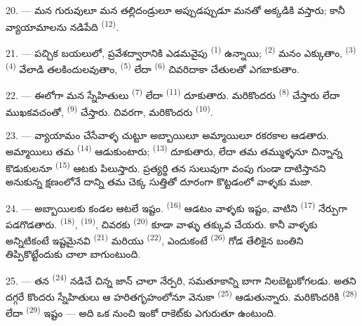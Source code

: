 20. --- మన గురువులూ మన తల్లిదండ్రులూ అప్పుడప్పుడూ మనతో అక్కడికి వస్తారు; కానీ వ్యాయామాలను
నడిపేది  \textsuperscript{(12)}.

21. --- పచ్చిక బయలులో, ప్రవేశద్వారానికి ఎడమవైపు  \textsuperscript{(1)}
ఉన్నాయి;  \textsuperscript{(2)} మనం ఎక్కుతాం, 
\textsuperscript{(3)}  \textsuperscript{(4)} వేలాడి తలకిందులవుతాం,
 \textsuperscript{(5)} లేదా  \textsuperscript{(6)}
చివరిదాకా చేతులతో ఎగబాకుతాం.

22. --- ఈలోగా మన స్నేహితులు  \textsuperscript{(7)} లేదా
 \textsuperscript{(11)} దూకుతారు. మరికొందరు 
\textsuperscript{(8)} చేస్తారు లేదా ముఖకవచంతో,  
\textsuperscript{(9)} చేస్తారు. చివరగా, మరికొందరు 
\textsuperscript{(10)}.

\VUsaut{4.6mm}
\VUsaut{3.0mm}

23. --- వ్యాయామం చేసేవాళ్ళ చుట్టూ అబ్బాయిలూ అమ్మాయిలూ రకరకాల  ఆడతారు. అమ్మాయిలు
తమ  \textsuperscript{(14)} ఆడుకుంటారు;  \textsuperscript{(13)}
దూకుతారు, లేదా తమ తమ్ముళ్ళనూ చిన్నాన్న కొడుకులనూ  \textsuperscript{(15)} ఆటకు
పిలుస్తారు. ప్రత్యర్థి తన  సులువుగా వంపు గుండా దాటిస్తానని అనుకున్న క్షణంలోనే
దాన్ని తమ చెక్క సుత్తితో దూరంగా కొట్టడంలో వాళ్ళకు మజా.

24. --- అబ్బాయిలకు కండల ఆటలే ఇష్టం.  \textsuperscript{(16)} ఆడటం వాళ్ళకు
ఇష్టం, వాటిని  \textsuperscript{(17)} నేర్పుగా పడగొడతారు. 
\textsuperscript{(18)},  \textsuperscript{(19)}, చివరకు 
\textsuperscript{(20)} కూడా వాళ్ళు తక్కువ చేయరు. కానీ వాళ్ళకు అన్నిటికంటే ఇష్టమైనవి
 \textsuperscript{(21)} మరియు  \textsuperscript{(22)},
ఎందుకంటే  \textsuperscript{(26)} గోడ తేలికైన బంతిని తిప్పికొట్టేందుకు చాలా
బాగుంటుంది.

25. --- తన  \textsuperscript{(24)} నడిచే చిన్న జాన్ చాలా నేర్పరి,
సమతూకాన్ని బాగా నిలబెట్టుకోగలడు. అతని దగ్గరే కొందరు స్నేహితులు ఆ హరితగృహంలోనూ 
వెనుకా  \textsuperscript{(25)} ఆడుతున్నారు. మరికొందరికి
 \textsuperscript{(28)} లేదా 
\textsuperscript{(29)} ఇష్టం — అది ఒక  నుంచి ఇంకో రాకెట్‌కు ఎగురుతూ ఉంటుంది.

